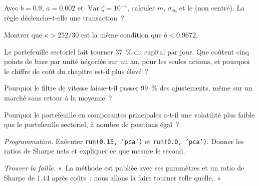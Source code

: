 \begin{exercise}[$\star$]\label{exo:s1:residual-and-principal-component-stat-arb:2}
Avec $b = 0.9$, $a = 0.002$ et $\operatorname{Var}\zeta = 10^{-4}$, calculer $m$, $\sigma_{\mathrm{eq}}$ et le  (non centré). La règle déclenche-t-elle une transaction~?
\end{exercise}

\begin{exercise}[$\star$]\label{exo:s1:residual-and-principal-component-stat-arb:3}
Montrer que $\kappa > 252/30$ est la même condition que $b < 0.9672$.
\end{exercise}

\begin{exercise}[$\star\star$]\label{exo:s1:residual-and-principal-component-stat-arb:4}
Le portefeuille sectoriel fait tourner 37~\% du capital par jour. Que coûtent cinq points de base par unité négociée sur un an, pour les seules actions, et pourquoi le
chiffre de coût du chapitre est-il plus élevé~?
\end{exercise}

\begin{exercise}[$\star\star$]\label{exo:s1:residual-and-principal-component-stat-arb:5}
Pourquoi le filtre de vitesse laisse-t-il passer 99~\% des ajustements, même sur un marché sans retour à la moyenne~?
\end{exercise}

\begin{exercise}[$\star\star$]\label{exo:s1:residual-and-principal-component-stat-arb:6}
Pourquoi le portefeuille en composantes principales a-t-il une volatilité plus faible que le portefeuille sectoriel, à nombre de positions égal~?
\end{exercise}

\begin{exercise}[$\star\star\star$]\label{exo:s1:residual-and-principal-component-stat-arb:7}
\emph{Programmation.} Exécuter \texttt{run(0.15, 'pca')} et \texttt{run(0.0, 'pca')}. Donner les ratios de Sharpe nets et expliquer ce que mesure le second.
\end{exercise}

\begin{exercise}[$\star\star\star$]\label{exo:s1:residual-and-principal-component-stat-arb:8}
\emph{Trouver la faille.} «~La méthode est publiée avec ses paramètres et un ratio de Sharpe de 1.44 après coûts~; nous allons la faire tourner telle quelle.~»
\end{exercise}

